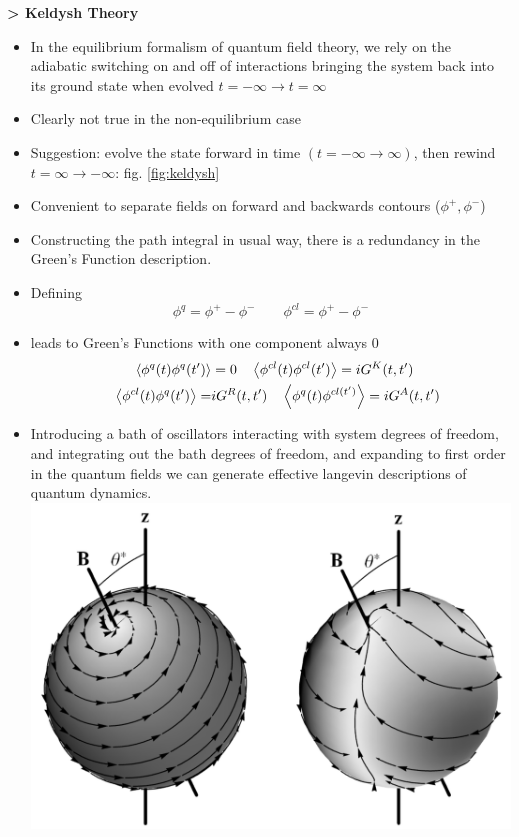 \documentclass[a0,portrait]{a0poster}
\newenvironment{Section}[1]				%
{
\par 
\flushleft
\colorbox{boxcol}{%
\sffamily\large\bf\color{headingcol}> \color{white} #1%
\hspace{0.5cm}}
\par\nobreak 
\nointerlineskip 						%
\setlength\parskip{-1pt}					%
\begin{lrbox}\envbox						%
\begin{minipage}{0.95\columnwidth}		%
}
{\par
\end{minipage}\end{lrbox}				%
\fcolorbox{boxcol}{fillcol}{\usebox\envbox}	%
\vspace{1cm}							%
}
\begin{document}
\begin{multicols}{3}
\begin{Section}{Keldysh Theory}
\begin{itemize}
    \item In the equilibrium formalism of quantum field theory, we rely on the adiabatic switching on and off of interactions bringing the system back into its ground state when evolved $t=-\infty \rightarrow t=\infty$
    \item Clearly not true in the non-equilibrium case
    \item Suggestion: evolve the state forward in time $(t=-\infty \rightarrow \infty)$, then rewind $t=\infty \rightarrow -\infty$: fig. \ref{fig:keldysh}
    \item Convenient to separate fields on forward and backwards contours ($\phi^+, \phi^-$)
    \item Constructing the path integral in usual way, there is a redundancy in the Green's Function description. 
    \item Defining
    \begin{equation}
        \phi^q = \phi^+ - \phi^- \qquad \phi^{cl} = \phi^+-\phi^-
    \end{equation}
    \item leads to Green's Functions with one component always 0
    \begin{align}
        \ev{\phi^q(t) \phi^q(t')} &= 0  \quad \ev{\phi^{cl}(t)\phi^{cl}(t')} = iG^K(t, t') \\
        \quad \ev{\phi^{cl}(t)\phi^{q}(t')} =& iG^R(t, t') \quad \ev{\phi^q(t)\phi^{cl(t')}} = iG^A(t, t')
    \end{align}
    \item Introducing a bath of oscillators interacting with system degrees of freedom, and integrating out the bath degrees of freedom, and expanding to first order in the quantum fields we can generate effective langevin descriptions of quantum dynamics.
    \includegraphics[width=\linewidth]{spins1}
\end{itemize}


\end{Section}
\end{multicols}
\end{document}
